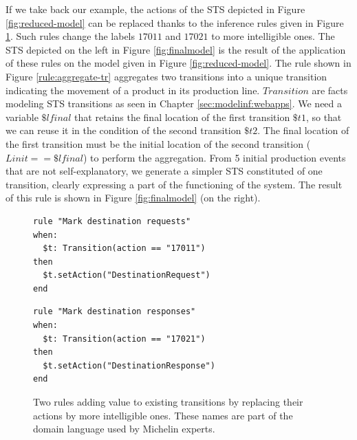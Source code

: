 \begin{example}
If we take back our example, the actions of the STS depicted in
Figure \ref{fig:reduced-model} can be replaced thanks to the
inference rules given in Figure \ref{rule:rename-tr}. Such rules
change the labels $17011$ and $17021$ to more intelligible ones.
The STS depicted on the left in Figure \ref{fig:finalmodel} is
the result of the application of these rules on the model given
in Figure \ref{fig:reduced-model}.
The rule shown in Figure \ref{rule:aggregate-tr} aggregates
two transitions into a unique transition indicating the movement
of a product in its production line. $Transition$ are facts
modeling STS transitions as seen in Chapter
\ref{sec:modelinf:webapps}. We need a variable $\$lfinal$ that
retains the final location of the first transition $\$t1$, so
that we can reuse it in the condition of the second transition
$\$t2$. The final location of the first transition must be the
initial location of the second transition ($Linit == \$lfinal$)
to perform the aggregation. From 5 initial production events
that are not self-explanatory, we generate a simpler STS
constituted of one transition, clearly expressing a part of the
functioning of the system. The result of this rule is shown in
Figure \ref{fig:finalmodel} (on the right).
\end{example}

\begin{figure}[ht]
\begin{framed}
\begin{BVerbatim}
rule "Mark destination requests"
when:
  $t: Transition(action == "17011")
then
  $t.setAction("DestinationRequest")
end
\end{BVerbatim}
\end{framed}

\begin{framed}
\begin{BVerbatim}
rule "Mark destination responses"
when:
  $t: Transition(action == "17021")
then
  $t.setAction("DestinationResponse")
end
\end{BVerbatim}
\end{framed}

  \caption{Two rules adding value to existing transitions by
  replacing their actions by more intelligible ones. These names
  are part of the domain language used by Michelin experts.}
  \label{rule:rename-tr}
\end{figure}

